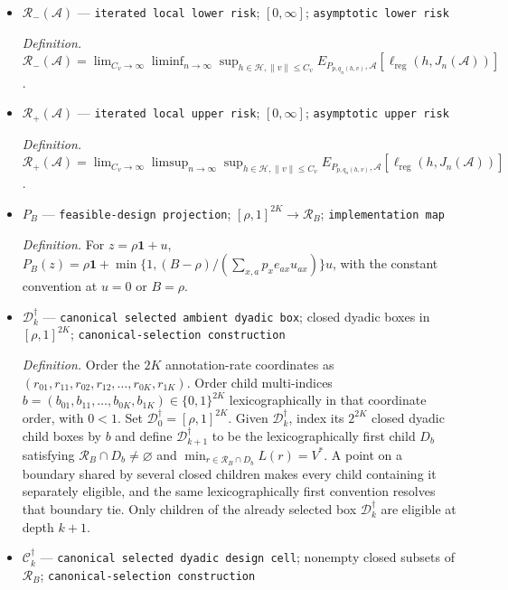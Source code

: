 \documentclass{article}
\begin{document}
\begin{itemize}
  \item \(\mathcal R_-(\mathcal A)\) --- \texttt{iterated local lower risk}; \([0,\infty]\); \texttt{asymptotic lower risk}
  \par\smallskip\noindent\emph{Definition.} \(\mathcal R_-(\mathcal A)=\lim_{C_v\to\infty}\liminf_{n\to\infty}\sup_{h\in\mathcal H,\lVert v\rVert\le C_v}E_{P_{p,q_n(h,v)},\mathcal A}[\ell_{\mathrm{reg}}(h,J_n(\mathcal A))]\).
  \item \(\mathcal R_+(\mathcal A)\) --- \texttt{iterated local upper risk}; \([0,\infty]\); \texttt{asymptotic upper risk}
  \par\smallskip\noindent\emph{Definition.} \(\mathcal R_+(\mathcal A)=\lim_{C_v\to\infty}\limsup_{n\to\infty}\sup_{h\in\mathcal H,\lVert v\rVert\le C_v}E_{P_{p,q_n(h,v)},\mathcal A}[\ell_{\mathrm{reg}}(h,J_n(\mathcal A))]\).
  \item \(P_B\) --- \texttt{feasible-\allowbreak{}design projection}; \([\rho,1]^{2K}\to\mathcal R_B\); \texttt{implementation map}
  \par\smallskip\noindent\emph{Definition.} For \(z=\rho\mathbf 1+u\), \(P_B(z)=\rho\mathbf 1+\min\{1,(B-\rho)/(\sum_{x,a}p_xe_{ax}u_{ax})\}u\), with the constant convention at \(u=0\) or \(B=\rho\).
  \item \(\mathcal D_k^\dagger\) --- \texttt{canonical selected ambient dyadic box}; closed dyadic boxes in \([\rho,1]^{2K}\); \texttt{canonical-\allowbreak{}selection construction}
  \par\smallskip\noindent\emph{Definition.} Order the \(2K\) annotation-rate coordinates as \((r_{01},r_{11},r_{02},r_{12},\ldots,r_{0K},r_{1K})\). Order child multi-indices \(b=(b_{01},b_{11},\ldots,b_{0K},b_{1K})\in\{0,1\}^{2K}\) lexicographically in that coordinate order, with \(0<1\). Set \(\mathcal D_0^\dagger=[\rho,1]^{2K}\). Given \(\mathcal D_k^\dagger\), index its \(2^{2K}\) closed dyadic child boxes by \(b\) and define \(\mathcal D_{k+1}^\dagger\) to be the lexicographically first child \(D_b\) satisfying \(\mathcal R_B\cap D_b\ne\varnothing\) and \(\min_{r\in\mathcal R_B\cap D_b}L(r)=V^*\). A point on a boundary shared by several closed children makes every child containing it separately eligible, and the same lexicographically first convention resolves that boundary tie. Only children of the already selected box \(\mathcal D_k^\dagger\) are eligible at depth \(k+1\).
  \item \(\mathcal C_k^\dagger\) --- \texttt{canonical selected dyadic design cell}; nonempty closed subsets of \(\mathcal R_B\); \texttt{canonical-\allowbreak{}selection construction}

\end{itemize}
\end{document}
